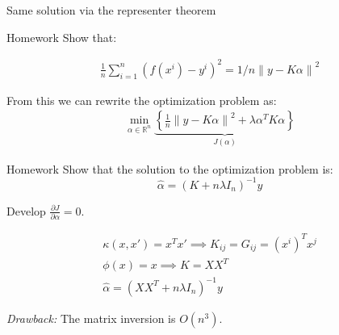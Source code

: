 \begin{example}[breakable]{Same solution via the representer theorem}{}
\begin{exercise}{Homework}{}
	Show that:

	\begin{align*}
		\frac{1}{n} \sum_{i=1}^n \left( f(x^i) - y^i \right)^2
		= 1/n \left\lVert y - K\alpha \right\rVert^2
	\end{align*}
\end{exercise}

From this we can rewrite the optimization problem as:
\begin{align*}
	\min_{\alpha \in \mathds R^n}
  \underbrace{
	\left\{
	\frac{1}{n}
	\left\lVert y - K\alpha \right\rVert^2 + \lambda \alpha^T K \alpha
	\right\}
}_{J(\alpha)}
\end{align*}

\begin{exercise}{Homework}{}
  Show that the solution to the optimization problem is:
  \begin{equation*}
    \hat\alpha = (K + n\lambda I_n)^{-1} y
  \end{equation*}

  \begin{hint}
    Develop $\frac{\partial J}{\partial \alpha} = 0$.
  \end{hint}
\end{exercise}
\end{example}

\begin{align*}
  \kappa(x, x') = x^Tx' \implies K_{ij} = G_{ij} = (x^i)^T x^j \\
  \phi(x) = x \implies K = XX^T \\
  \hat \alpha = (XX^T + n\lambda I_n)^{-1} y \tag{Dual ridge regression}
\end{align*}

\begin{note}
  \emph{Drawback:} The matrix inversion is $O(n^3)$.
\end{note}
